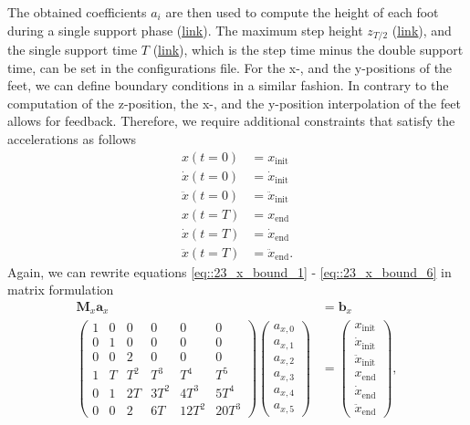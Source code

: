 The obtained coefficients $a_i$ are then used to compute the height of each foot during a single support phase (\href{https://github.com/mhubii/nmpc_pattern_generator/blob/c82c64a28da7527e75442764f585bd50a8f61ee9/libs/pattern_generator/src/interpolation.cpp#L779}{\underline{link}}). The maximum step height $z_{T/2}$ (\href{https://github.com/mhubii/nmpc_pattern_generator/blob/c82c64a28da7527e75442764f585bd50a8f61ee9/libs/pattern_generator/configs.yaml#L22}{\underline{link}}), and the single support time $T$ (\href{https://github.com/mhubii/nmpc_pattern_generator/blob/c82c64a28da7527e75442764f585bd50a8f61ee9/libs/pattern_generator/configs.yaml#L21}{\underline{link}}), which is the step time minus the double support time, can be set in the configurations file. For the x-, and the y-positions of the feet, we can define boundary conditions in a similar fashion. In contrary to the computation of the z-position, the x-, and the y-position interpolation of the feet allows for feedback. Therefore, we require additional constraints that satisfy the accelerations as follows
\begin{align}
	x(t = 0) &= x_\text{init} 
	\label{eq::23_x_bound_1}\\
	\dot{x}(t=0) &= \dot{x}_\text{init} \\
	\ddot{x}(t=0) &= \ddot{x}_\text{init} \\
	x(t=T) &= x_\text{end}\\
	\dot{x}(t=T) &= \dot{x}_\text{end} \\
	\ddot{x}(t=T) &= \ddot{x}_\text{end}.
	\label{eq::23_x_bound_6}
\end{align}
Again, we can rewrite equations \ref{eq::23_x_bound_1} - \ref{eq::23_x_bound_6} in matrix formulation
\begin{align}
	\bm{M}_x\bm{a}_x &= \bm{b}_x \\
	\begin{pmatrix}
		1 & 0 & 0 & 0 & 0 & 0 \\
		0 & 1 & 0 & 0 & 0 & 0 \\
		0 & 0 & 2 & 0 & 0 & 0 \\
		1 & T & T^2 & T^3 & T^4 & T^5 \\
		0 & 1 & 2 T & 3 T^2 & 4 T^3 & 5 T^4 \\
		0 & 0 & 2 & 6 T & 12 T^2 & 20 T^3
	\end{pmatrix}
	\begin{pmatrix}
		a_{x,0} \\
		a_{x,1} \\
		a_{x,2} \\
		a_{x,3} \\
		a_{x,4} \\
		a_{x,5}
	\end{pmatrix} &=
	\begin{pmatrix}
		x_\text{init} \\
		\dot{x}_\text{init} \\
		\ddot{x}_\text{init} \\
		x_\text{end} \\
		\dot{x}_\text{end} \\
		\ddot{x}_\text{end} 
	\end{pmatrix},
\end{align}
